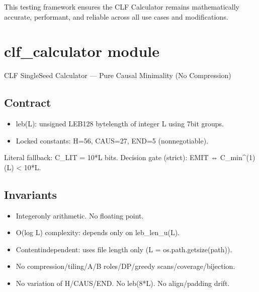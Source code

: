 \documentclass[letterpaper,10pt,english]{sphinxmanual}
\begin{document}
\sphinxAtStartPar
This testing framework ensures the CLF Calculator remains mathematically accurate, performant, and reliable across all use cases and modifications.

\sphinxstepscope


\section{clf\_calculator module}
\label{\detokenize{clf_calculator:clf-calculator-module}}\label{\detokenize{clf_calculator::doc}}\label{\detokenize{clf_calculator:module-clf_calculator}}
\sphinxAtStartPar
CLF Single\sphinxhyphen{}Seed Calculator — Pure Causal Minimality (No Compression)


\subsection{Contract}
\label{\detokenize{clf_calculator:contract}}\begin{description}
\begin{itemize}
\item {} 
\sphinxAtStartPar
leb(L): unsigned LEB128 byte\sphinxhyphen{}length of integer L using 7\sphinxhyphen{}bit groups.

\item {} 
\sphinxAtStartPar
Locked constants: H=56, CAUS=27, END=5 (non\sphinxhyphen{}negotiable).

\end{itemize}

\end{description}

\sphinxAtStartPar
Literal fallback: C\_LIT = 10*L bits.
Decision gate (strict): EMIT ⇔ C\_min\textasciicircum{}(1)(L) \textless{} 10*L.


\subsection{Invariants}
\label{\detokenize{clf_calculator:invariants}}\begin{itemize}
\item {} 
\sphinxAtStartPar
Integer\sphinxhyphen{}only arithmetic. No floating point.

\item {} 
\sphinxAtStartPar
O(log L) complexity: depends only on leb\_len\_u(L).

\item {} 
\sphinxAtStartPar
Content\sphinxhyphen{}independent: uses file length only (L = os.path.getsize(path)).

\item {} 
\sphinxAtStartPar
No compression/tiling/A/B roles/DP/greedy scans/coverage/bijection.

\item {} 
\sphinxAtStartPar
No variation of H/CAUS/END. No leb(8*L). No align/padding drift.

\end{itemize}
\end{document}

